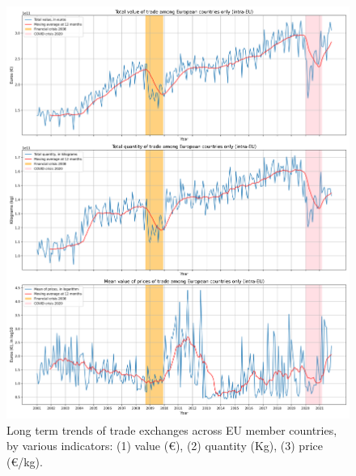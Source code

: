 \begin{figure}
    \centering
    \includegraphics[width=\textwidth]{pics/TOTAL_VQP_INTRA.png}
    \caption{Long term trends of trade exchanges across EU member countries, by various indicators: (1) value (€), (2) quantity (Kg), (3) price (€/kg).}
    \label{fig:totaleu}
\end{figure}

